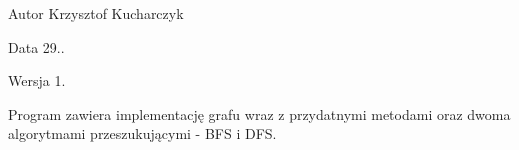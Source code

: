\begin{DoxyAuthor}{\-Autor}
\-Krzysztof \-Kucharczyk 
\end{DoxyAuthor}
\begin{DoxyDate}{\-Data}
29.. 
\end{DoxyDate}
\begin{DoxyVersion}{\-Wersja}
1.
\end{DoxyVersion}
\-Program zawiera implementację grafu wraz z przydatnymi metodami oraz dwoma algorytmami przeszukującymi -\/ \-B\-F\-S i \-D\-F\-S. 